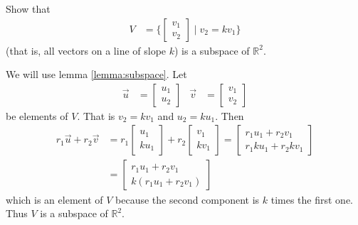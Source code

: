 \begin{example}
 Show that
 \begin{align*}
 V & = \{ \begin{bmatrix}
 v_1 \\ v_2 
 \end{bmatrix} \; | \; v_2 = k v_1 \}
 \end{align*}
(that is, all vectors on a line of slope $k$) is a subspace of $\mathbb{R}^2$. 
 
 \solution
 
 We will use lemma \ref{lemma:subspace}.  Let 
%
\begin{align*}
\vec{u} & = \begin{bmatrix}
u_1 \\ u_2 
\end{bmatrix} & \vec{v} & = \begin{bmatrix}
v_1 \\ v_2 
\end{bmatrix}
\end{align*}
be elements of $V$.  That is $v_2 = k v_1$ and $u_2 = ku_1$.  Then 
%
\begin{align*}
r_1 \vec{u} + r_2 \vec{v} & = r_1 \begin{bmatrix}
u_1 \\ k u_1 
\end{bmatrix} + r_2 \begin{bmatrix}
v_1 \\ k v_1 
\end{bmatrix} =  \begin{bmatrix}
r_1 u_1 + r_2 v_1 \\ r_1 k u_1 + r_2 k v_1 
\end{bmatrix} \\
& = \begin{bmatrix}
r_1 u_1 + r_2 v_1 \\ k (r_1 u_1 + r_2 v_1) 
\end{bmatrix}
\end{align*}
which is an element of $V$ because the second component is $k$ times the first one. Thus $V$ is a subspace of $\mathbb{R}^2$.  
\end{example}

\phantom{hi}

